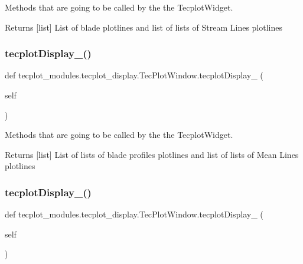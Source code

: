 Methods that are going to be called by the the Tecplot\+Widget. 

\begin{DoxyReturn}{Returns}
\mbox{[}list\mbox{]} List of blade plotlines and list of lists of Stream Lines plotlines 
\end{DoxyReturn}
\hypertarget{classtecplot__modules_1_1tecplot__display_1_1_tec_plot_window_aec1f3f862b488e5f66161ca7241908c1}{}\label{classtecplot__modules_1_1tecplot__display_1_1_tec_plot_window_aec1f3f862b488e5f66161ca7241908c1} 
\subsubsection{\texorpdfstring{tecplot\+Display\+\_()}{tecplotDisplay\_2()}}
{\footnotesize\ttfamily def tecplot\+\_\+modules.\+tecplot\+\_\+display.\+Tec\+Plot\+Window.\+tecplot\+Display\+\_ (\begin{DoxyParamCaption}\item[{}]{self }\end{DoxyParamCaption})}



Methods that are going to be called by the the Tecplot\+Widget. 

\begin{DoxyReturn}{Returns}
\mbox{[}list\mbox{]} List of lists of blade profiles plotlines and list of lists of Mean Lines plotlines 
\end{DoxyReturn}
\hypertarget{classtecplot__modules_1_1tecplot__display_1_1_tec_plot_window_ae29c235476c3ca1ff19f4b933b86ed86}{}\label{classtecplot__modules_1_1tecplot__display_1_1_tec_plot_window_ae29c235476c3ca1ff19f4b933b86ed86} 
\subsubsection{\texorpdfstring{tecplot\+Display\+\_()}{tecplotDisplay\_3()}}
{\footnotesize\ttfamily def tecplot\+\_\+modules.\+tecplot\+\_\+display.\+Tec\+Plot\+Window.\+tecplot\+Display\+\_ (\begin{DoxyParamCaption}\item[{}]{self }\end{DoxyParamCaption})}




